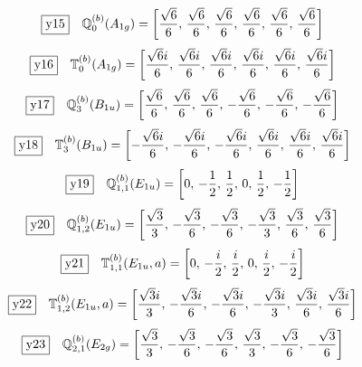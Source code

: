 \documentclass[fleqn,10pt,landscape]{jsarticle}
\begin{document}
\begin{dmath*}
\fbox{y15}\quad \mathbb{Q}_{0}^{(b)}(A_{1g})=\left[ \frac{\sqrt{6}}{6},\, \frac{\sqrt{6}}{6},\, \frac{\sqrt{6}}{6},\, \frac{\sqrt{6}}{6},\, \frac{\sqrt{6}}{6},\, \frac{\sqrt{6}}{6} \right]
\end{dmath*}
\begin{dmath*}
\fbox{y16}\quad \mathbb{T}_{0}^{(b)}(A_{1g})=\left[ \frac{\sqrt{6} i}{6},\, \frac{\sqrt{6} i}{6},\, \frac{\sqrt{6} i}{6},\, \frac{\sqrt{6} i}{6},\, \frac{\sqrt{6} i}{6},\, \frac{\sqrt{6} i}{6} \right]
\end{dmath*}
\begin{dmath*}
\fbox{y17}\quad \mathbb{Q}_{3}^{(b)}(B_{1u})=\left[ \frac{\sqrt{6}}{6},\, \frac{\sqrt{6}}{6},\, \frac{\sqrt{6}}{6},\, - \frac{\sqrt{6}}{6},\, - \frac{\sqrt{6}}{6},\, - \frac{\sqrt{6}}{6} \right]
\end{dmath*}
\begin{dmath*}
\fbox{y18}\quad \mathbb{T}_{3}^{(b)}(B_{1u})=\left[ - \frac{\sqrt{6} i}{6},\, - \frac{\sqrt{6} i}{6},\, - \frac{\sqrt{6} i}{6},\, \frac{\sqrt{6} i}{6},\, \frac{\sqrt{6} i}{6},\, \frac{\sqrt{6} i}{6} \right]
\end{dmath*}
\begin{dmath*}
\fbox{y19}\quad \mathbb{Q}_{1,1}^{(b)}(E_{1u})=\left[ 0,\, - \frac{1}{2},\, \frac{1}{2},\, 0,\, \frac{1}{2},\, - \frac{1}{2} \right]
\end{dmath*}
\begin{dmath*}
\fbox{y20}\quad \mathbb{Q}_{1,2}^{(b)}(E_{1u})=\left[ \frac{\sqrt{3}}{3},\, - \frac{\sqrt{3}}{6},\, - \frac{\sqrt{3}}{6},\, - \frac{\sqrt{3}}{3},\, \frac{\sqrt{3}}{6},\, \frac{\sqrt{3}}{6} \right]
\end{dmath*}
\begin{dmath*}
\fbox{y21}\quad \mathbb{T}_{1,1}^{(b)}(E_{1u},a)=\left[ 0,\, - \frac{i}{2},\, \frac{i}{2},\, 0,\, \frac{i}{2},\, - \frac{i}{2} \right]
\end{dmath*}
\begin{dmath*}
\fbox{y22}\quad \mathbb{T}_{1,2}^{(b)}(E_{1u},a)=\left[ \frac{\sqrt{3} i}{3},\, - \frac{\sqrt{3} i}{6},\, - \frac{\sqrt{3} i}{6},\, - \frac{\sqrt{3} i}{3},\, \frac{\sqrt{3} i}{6},\, \frac{\sqrt{3} i}{6} \right]
\end{dmath*}
\begin{dmath*}
\fbox{y23}\quad \mathbb{Q}_{2,1}^{(b)}(E_{2g})=\left[ \frac{\sqrt{3}}{3},\, - \frac{\sqrt{3}}{6},\, - \frac{\sqrt{3}}{6},\, \frac{\sqrt{3}}{3},\, - \frac{\sqrt{3}}{6},\, - \frac{\sqrt{3}}{6} \right]
\end{dmath*}
\end{document}
